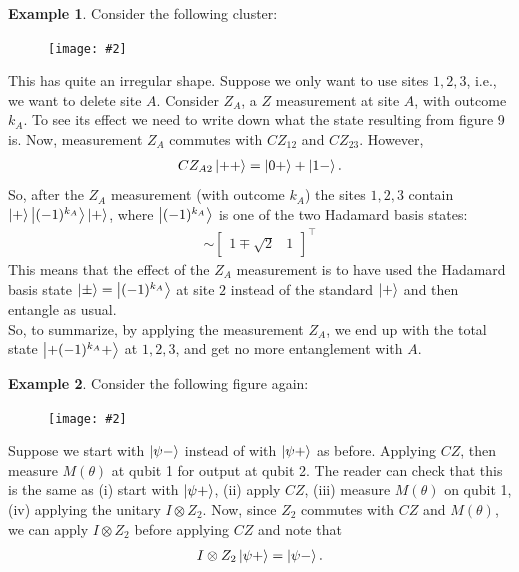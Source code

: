 \documentclass{book}
\theoremstyle{definition}
\newtheorem{exmp}{Example}[section]
\newcommand{\fig}[2]{
	\begin{figure}[!htb]
		\centering
		\texttt{[image: \#2]}
	\end{figure}}
\begin{document}
\begin{exmp}
Consider the following cluster:

\fig{0.45}{fig9}

This has quite an irregular shape. Suppose we only want to use sites $1,2,3$, i.e., we want to delete site $A$. Consider $Z_A$, a $Z$ measurement at site $A$, with outcome $k_A$. To see its effect we need to write down what the state resulting from figure 9 is. Now, measurement $Z_A$ commutes with $CZ_{12}$ and $CZ_{23}$. However, 
\begin{align}
CZ_{A2}\ket{++} = \ket{0+} + \ket{1-}.
\end{align}
So, after the $Z_A$ measurement (with outcome $k_A$) the sites $1,2,3$ contain $\ket{+}\ket{(-1)^{k_A}} \ket{+}$, where $\ket{(-1)^{k_A}}$ is one of the two Hadamard basis states:
\begin{align}
\sim \begin{bmatrix}
1\mp \sqrt{2} & 1
\end{bmatrix}^\top
\end{align}
This means that the effect of the $Z_A$ measurement is to have used the Hadamard basis state $\ket{\pm} = \ket{(-1)^{k_A}}$ at site $2$ instead of the standard $\ket{+}$ and then entangle as usual. \\

So, to summarize, by applying the measurement $Z_A$, we end up with the total state $\ket{+(-1)^{k_A}+}$ at $1,2,3$, and get no more entanglement with $A$. 



\end{exmp}



\begin{exmp}
	Consider the following figure again:
	
	\fig{0.4}{fig7bis}
	
	Suppose we start with $\ket{\psi -}$ instead of with $\ket{\psi +}$ as before. Applying $CZ$, then measure $M(\theta)$ at qubit 1 for output at qubit 2. The reader can check that this is the same as (i) start with $\ket{\psi +}$, (ii) apply $CZ$, (iii) measure $M(\theta)$ on qubit 1, (iv) applying the unitary $I\otimes Z_2$. Now, since $Z_2$ commutes with $CZ$ and $M(\theta)$, we can apply $I \otimes Z_2$ before applying $CZ$ and note that
	\begin{align}
	I \otimes Z_2 \ket{\psi +} = \ket{\psi -}. 
	\end{align}
\end{exmp}
\end{document}
